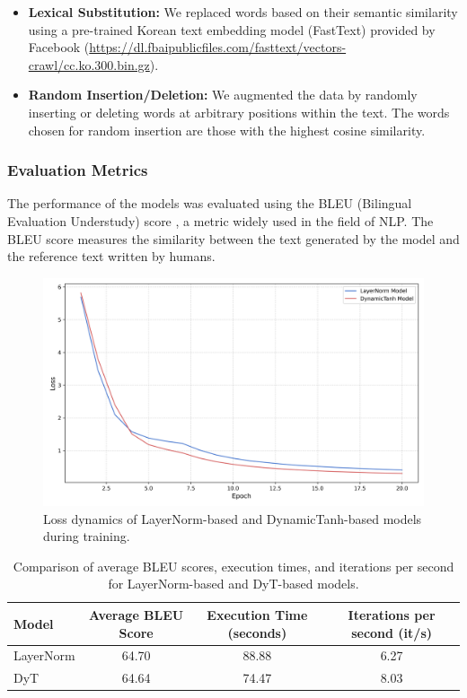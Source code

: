 \documentclass{article}
\begin{document}
\begin{itemize}
    \item \textbf{Lexical Substitution:} We replaced words based on their semantic similarity using a pre-trained Korean text embedding model (FastText) provided by Facebook (\url{https://dl.fbaipublicfiles.com/fasttext/vectors-crawl/cc.ko.300.bin.gz}).
    \item \textbf{Random Insertion/Deletion:} We augmented the data by randomly inserting or deleting words at arbitrary positions within the text. The words chosen for random insertion are those with the highest cosine similarity. 
\end{itemize}

\subsubsection{Evaluation Metrics}
The performance of the models was evaluated using the BLEU (Bilingual Evaluation Understudy) score \cite{papineni2002bleu}, a metric widely used in the field of NLP. The BLEU score measures the similarity between the text generated by the model and the reference text written by humans.

\begin{figure}[h!]
    \centering
    \includegraphics[width=1\textwidth]{figure_loss_dynamics.png}
    \caption{Loss dynamics of LayerNorm-based and DynamicTanh-based models during training.}
    \label{fig:loss_dynamics}
\end{figure}

\begin{center}
\begin{table}
\caption{Comparison of average BLEU scores, execution times, and iterations per second for LayerNorm-based and DyT-based models.}
\label{tab:experimental_results}
\begin{tabular}{lccc}
\toprule
Model & Average BLEU Score & Execution Time (seconds) & Iterations per second (it/s) \\
\midrule
LayerNorm & 64.70 & 88.88 & 6.27 \\
DyT & 64.64 & 74.47 & 8.03 \\
\bottomrule
\end{tabular}
\end{table}
\end{center}
\end{document}
